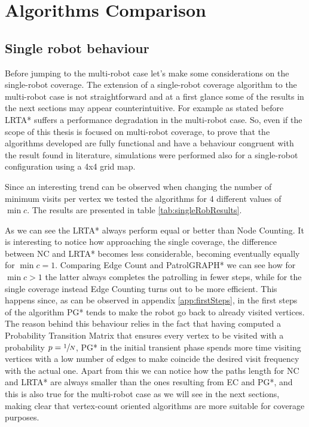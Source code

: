 \section{Algorithms Comparison}

\subsection{Single robot behaviour}
\label{sec:singleRob}
Before jumping to the multi-robot case let's make some considerations on the single-robot coverage. The extension of a single-robot coverage algorithm to the multi-robot case is not straightforward and at a first glance some of the results in the next sections may appear counterintuitive. For example as stated before LRTA* suffers a performance degradation in the multi-robot case. So, even if the scope of this thesis is focused on multi-robot coverage, to prove that the algorithms developed are fully functional and have a behaviour congruent with the result found in literature, simulations were performed also for a single-robot configuration using a 4x4 grid map. 


Since an interesting trend can be observed when changing the number of minimum visits per vertex we tested the algorithms for 4 different values of $\min c$.  The results are presented in table \ref{tab:singleRobResults}.



As we can see the LRTA* always perform equal or better than Node Counting. It is interesting to notice how approaching the single coverage, the difference between NC and LRTA* becomes less considerable, becoming eventually equally for \mbox{$\min c=1$}.
Comparing Edge Count and PatrolGRAPH* we can see how for \mbox{$\min c>1$} the latter always completes the patrolling in fewer steps, while for the single coverage instead Edge Counting turns out to be more efficient. This happens since, as can be observed in appendix \ref{app:firstSteps}, in the first steps of the algorithm PG* tends to make the robot go back to already visited vertices. The reason behind this behaviour relies in the fact that having computed a Probability Transition Matrix that ensures every vertex to be visited with a probability $p=\sfrac{1}{N}$, PG* in the initial transient phase spends more time visiting vertices with a low number of edges to make coincide the desired visit frequency with the actual one.
Apart from this we can notice how the paths length for NC and LRTA* are always smaller than the ones resulting from EC and PG*, and this is also true for the multi-robot case as we will see in the next sections, making clear that vertex-count oriented algorithms are more suitable for coverage purposes.

